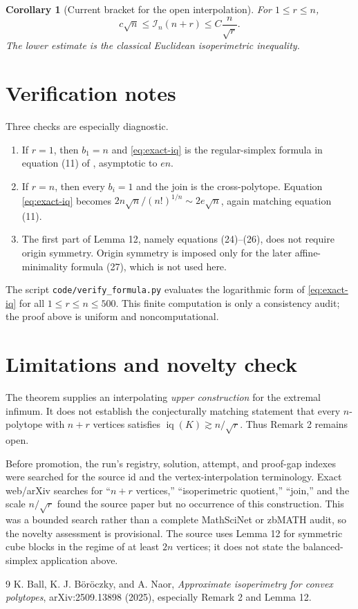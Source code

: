 \documentclass[11pt]{article}
\newtheorem{corollary}[theorem]{Corollary}
\newcommand{\iq}{\operatorname{iq}}
\begin{document}
\begin{corollary}[Current bracket for the open interpolation]\label{cor:bracket}
For $1\le r\le n$,
\[
 c\sqrt n\le \mathcal I_n(n+r)\le C\frac{n}{\sqrt r}.
\]
The lower estimate is the classical Euclidean isoperimetric inequality.
\end{corollary}

\section{Verification notes}

Three checks are especially diagnostic.
\begin{enumerate}[leftmargin=2em]
\item If $r=1$, then $b_1=n$ and \eqref{eq:exact-iq} is the regular-simplex
formula in equation (11) of \cite{BBN}, asymptotic to $en$.
\item If $r=n$, then every $b_i=1$ and the join is the cross-polytope.
Equation \eqref{eq:exact-iq} becomes
$2n\sqrt n/(n!)^{1/n}\sim2e\sqrt n$, again matching equation (11).
\item The first part of Lemma 12, namely equations (24)--(26), does not
require origin symmetry.  Origin symmetry is imposed only for the later
affine-minimality formula (27), which is not used here.
\end{enumerate}

The script \texttt{code/verify\_formula.py} evaluates the logarithmic form of
\eqref{eq:exact-iq} for all $1\le r\le n\le500$.  This finite computation is
only a consistency audit; the proof above is uniform and noncomputational.

\section{Limitations and novelty check}

The theorem supplies an interpolating \emph{upper construction} for the
extremal infimum.  It does not establish the conjecturally matching statement
that every $n$-polytope with $n+r$ vertices satisfies
$\iq(K)\gtrsim n/\sqrt r$.  Thus Remark 2 remains open.

Before promotion, the run's registry, solution, attempt, and proof-gap indexes
were searched for the source id and the vertex-interpolation terminology.
Exact web/arXiv searches for ``$n+r$ vertices,'' ``isoperimetric quotient,''
``join,'' and the scale $n/\sqrt r$ found the source paper but no occurrence
of this construction.  This was a bounded search rather than a complete
MathSciNet or zbMATH audit, so the novelty assessment is provisional.  The
source uses Lemma 12 for symmetric cube blocks in the regime of at least
$2n$ vertices; it does not state the balanced-simplex application above.

\begin{thebibliography}{9}
K. Ball, K. J. B\"or\"oczky, and A. Naor,
\emph{Approximate isoperimetry for convex polytopes},
arXiv:2509.13898 (2025), especially Remark 2 and Lemma 12.
\end{thebibliography}
\end{document}
